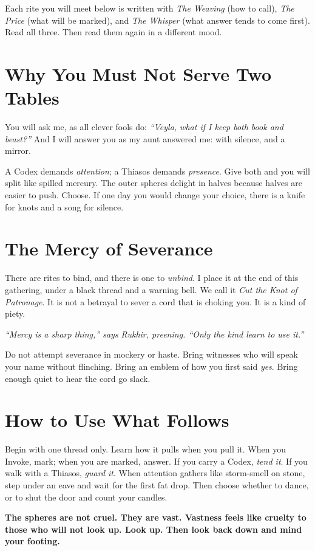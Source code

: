 \documentclass[12pt,twoside]{book}
\newcommand{\shadow}[1]{\textit{#1}}
\newcommand{\whisper}[1]{\textbf{#1}}
\begin{document}
Each rite you will meet below is written with \emph{The Weaving} (how to call), \emph{The Price} (what will be marked), and \emph{The Whisper} (what answer tends to come first). Read all three. Then read them again in a different mood.

\section*{Why You Must Not Serve Two Tables}
You will ask me, as all clever fools do: \emph{``Veyla, what if I keep both book and beast?''} And I will answer you as my aunt answered me: with silence, and a mirror.

A Codex demands \emph{attention}; a Thiasos demands \emph{presence}. Give both and you will split like spilled mercury. The outer spheres delight in halves because halves are easier to push. Choose. If one day you would change your choice, there is a knife for knots and a song for silence.

\section*{The Mercy of Severance}
There are rites to bind, and there is one to \emph{unbind}. I place it at the end of this gathering, under a black thread and a warning bell. We call it \emph{Cut the Knot of Patronage}. It is not a betrayal to sever a cord that is choking you. It is a kind of piety.

\shadow{``Mercy is a sharp thing,'' says Rukhir, preening. ``Only the kind learn to use it.''}

Do not attempt severance in mockery or haste. Bring witnesses who will speak your name without flinching. Bring an emblem of how you first said \emph{yes}. Bring enough quiet to hear the cord go slack.

\section*{How to Use What Follows}
Begin with one thread only. Learn how it pulls when you pull it. When you Invoke, mark; when you are marked, answer. If you carry a Codex, \emph{tend it}. If you walk with a Thiasos, \emph{guard it}. When attention gathers like storm-smell on stone, step under an eave and wait for the first fat drop. Then choose whether to dance, or to shut the door and count your candles.

\whisper{The spheres are not cruel. They are vast. Vastness feels like cruelty to those who will not look up. Look up. Then look back down and mind your footing.}
\end{document}
